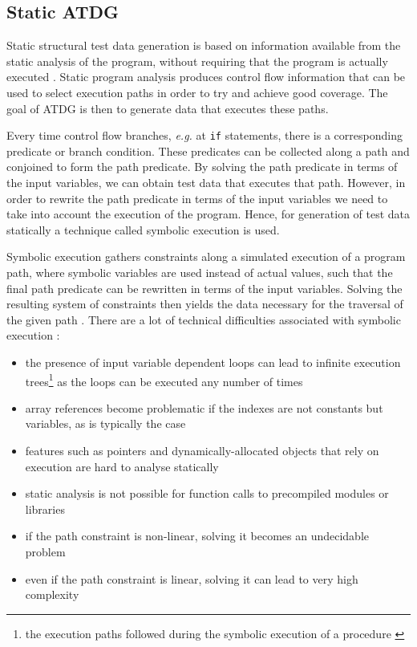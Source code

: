 \documentclass[a4paper,11pt,titlepage]{report}
\begin{document}

\subsection{Static ATDG}
Static structural test data generation is based on information available from the static analysis of the program, without requiring that the program is actually executed \cite{mcminn2004search}. Static program analysis produces control flow information that can be used to select execution paths in order to try and achieve good coverage. The goal of ATDG is then to generate data that executes these paths.

Every time control flow branches, \emph{e.g.} at \texttt{if} statements, there is a corresponding predicate or branch condition. These predicates can be collected along a path and conjoined to form the path predicate. By solving the path predicate in terms of the input variables, we can obtain test data that executes that path. However, in order to rewrite the path predicate in terms of the input variables we need to take into account the execution of the program. Hence, for generation of test data statically a technique called symbolic execution \cite{king1976symbolic} is used.

Symbolic execution gathers constraints along a simulated execution of a program path, where symbolic variables are used instead of actual values, such that the final path predicate can be rewritten in terms of the input variables. Solving the resulting system of constraints then yields the data necessary for the traversal of the given path \cite{king1975new, king1976symbolic}. There are a lot of technical difficulties associated with symbolic execution \cite{edvardsson1999survey,meudec2001atgen,mcminn2004search}:
\begin{itemize}
	\item the presence of input variable dependent loops can lead to infinite execution trees\footnote{the execution paths followed during the symbolic execution of a procedure \cite{king1976symbolic}} as the loops can be executed any number of times
	\item array references become problematic if the indexes are not constants but variables, as is typically the case
	\item features such as pointers and dynamically-allocated objects that rely on execution are hard to analyse statically
	\item static analysis is not possible for function calls to precompiled modules or libraries
	\item if the path constraint is non-linear, solving it becomes an undecidable problem
	\item even if the path constraint is linear, solving it can lead to very high complexity
\end{itemize}
\end{document}
